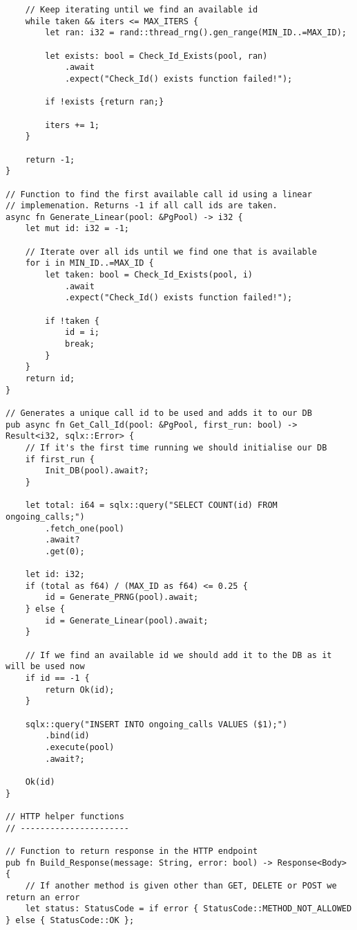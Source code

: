 \begin{verbatim}
    // Keep iterating until we find an available id
    while taken && iters <= MAX_ITERS {
        let ran: i32 = rand::thread_rng().gen_range(MIN_ID..=MAX_ID);

        let exists: bool = Check_Id_Exists(pool, ran)
            .await
            .expect("Check_Id() exists function failed!");

        if !exists {return ran;}

        iters += 1;
    }

    return -1;
}

// Function to find the first available call id using a linear
// implemenation. Returns -1 if all call ids are taken.
async fn Generate_Linear(pool: &PgPool) -> i32 {
    let mut id: i32 = -1;

    // Iterate over all ids until we find one that is available
    for i in MIN_ID..=MAX_ID {
        let taken: bool = Check_Id_Exists(pool, i)
            .await
            .expect("Check_Id() exists function failed!");

        if !taken {
            id = i;
            break;
        }
    }
    return id;
}

// Generates a unique call id to be used and adds it to our DB
pub async fn Get_Call_Id(pool: &PgPool, first_run: bool) -> Result<i32, sqlx::Error> {
    // If it's the first time running we should initialise our DB
    if first_run {
        Init_DB(pool).await?;
    }

    let total: i64 = sqlx::query("SELECT COUNT(id) FROM ongoing_calls;")
        .fetch_one(pool)
        .await?
        .get(0);

    let id: i32;
    if (total as f64) / (MAX_ID as f64) <= 0.25 {
        id = Generate_PRNG(pool).await;
    } else {
        id = Generate_Linear(pool).await;
    }

    // If we find an available id we should add it to the DB as it will be used now
    if id == -1 {
        return Ok(id);
    }

    sqlx::query("INSERT INTO ongoing_calls VALUES ($1);")
        .bind(id)
        .execute(pool)
        .await?;

    Ok(id)
}

// HTTP helper functions
// ----------------------

// Function to return response in the HTTP endpoint
pub fn Build_Response(message: String, error: bool) -> Response<Body> {
    // If another method is given other than GET, DELETE or POST we return an error
    let status: StatusCode = if error { StatusCode::METHOD_NOT_ALLOWED } else { StatusCode::OK };


\end{verbatim}

